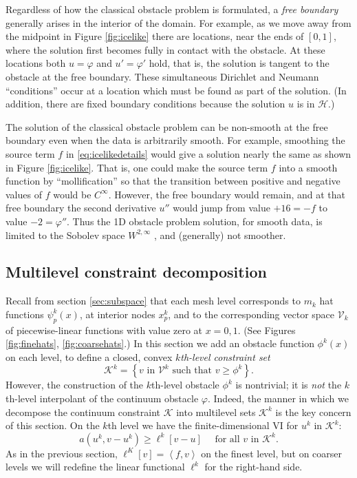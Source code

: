 \documentclass[letterpaper,final,12pt,reqno]{amsart}
\theoremstyle{claim}
\newcommand{\ip}[2]{\left<#1,#2\right>}
\numberwithin{equation}{section}
\numberwithin{figure}{section}
\numberwithin{table}{section}
\begin{document}
Regardless of how the classical obstacle problem is formulated, a \emph{free boundary} generally arises in the interior of the domain.  For example, as we move away from the midpoint in Figure \ref{fig:icelike} there are locations, near the ends of $[0,1]$, where the solution first becomes fully in contact with the obstacle.  At these locations both $u=\varphi$ and $u'=\varphi'$ hold, that is, the solution is tangent to the obstacle at the free boundary.  These simultaneous Dirichlet and Neumann ``conditions'' occur at a location which must be found as part of the solution.  (In addition, there are fixed boundary conditions because the solution $u$ is in $\mathcal{H}$.)

The solution of the classical obstacle problem can be non-smooth at the free boundary even when the data is arbitrarily smooth.  For example, smoothing the source term $f$ in \eqref{eq:icelikedetails} would give a solution nearly the same as shown in Figure \ref{fig:icelike}.  That is, one could make the source term $f$ into a smooth function by ``mollification'' \cite{Evans2010} so that the transition between positive and negative values of $f$ would be $C^\infty$.  However, the free boundary would remain, and at that free boundary the second derivative $u''$ would jump from value $+16=-f$ to value $-2=\varphi''$.  Thus the 1D obstacle problem solution, for smooth data, is limited to the Sobolev space $W^{2,\infty}$ \cite[section IV.6]{KinderlehrerStampacchia1980}, and (generally) not smoother.

\subsection*{Multilevel constraint decomposition}  Recall from section \ref{sec:subspace} that each mesh level corresponds to $m_k$ hat functions $\psi_p^k(x)$, at interior nodes $x_p^k$, and to the corresponding vector space $\mathcal{V}_k$ of piecewise-linear functions with value zero at $x=0,1$.  (See Figures \ref{fig:finehats}, \ref{fig:coarsehats}.)  In this section we add an obstacle function $\phi^k(x)$ on each level, to define a closed, convex $k$\emph{th-level constraint set}
\begin{equation}
\mathcal{K}^k = \left\{v \text{ in } \mathcal{V}^k \text{ such that } v \ge \phi^k\right\}.  \label{eq:levelKdefine}
\end{equation}
However, the construction of the $k$th-level obstacle $\phi^k$ is nontrivial; it is \emph{not} the $k$th-level interpolant of the continuum obstacle $\varphi$.  Indeed, the manner in which we decompose the continuum constraint $\mathcal{K}$ into multilevel sets $\mathcal{K}^k$ is the key concern of this section.  On the $k$th level we have the finite-dimensional VI for $u^k$ in $\mathcal{K}^k$:
\begin{equation}
  a(u^k,v-u^k) \ge \ell^k[v-u] \quad \text{ for all } v \text{ in } \mathcal{K}^k. \label{eq:levelvi}
\end{equation}
As in the previous section, $\ell^K[v]=\ip{f}{v}$ on the finest level, but on coarser levels we will redefine the linear functional $\ell^k$ for the right-hand side.
\end{document}
